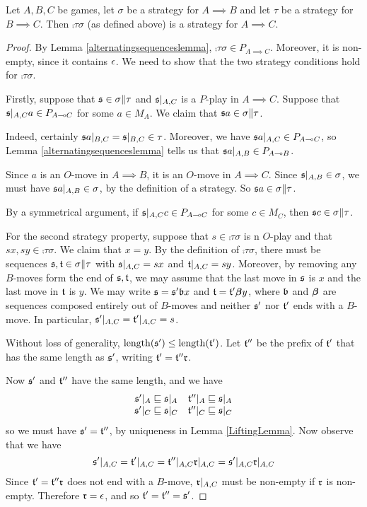 \documentclass[11pt]{article} %
\begin{document}
\begin{proposition}
  Let $A,B,C$ be games, let $\sigma$ be a strategy for $A\implies B$ and let $\tau$ be a strategy for $B\implies C$.  Then $\comp\tau\sigma$ (as defined above) is a strategy for $A\implies C$.  

  \begin{proof}
    By Lemma \ref{alternatingsequenceslemma}, $\comp\tau\sigma\in P_{A\implies C}$.  Moreover, it is non-empty, since it contains $\epsilon$.  We need to show that the two strategy conditions hold for $\comp\tau\sigma$.  

    Firstly, suppose that $\mathfrak s\in\sigma\|\tau$ and $\mathfrak s\vert_{A,C}$ is a $P$-play in $A\implies C$.  Suppose that $\mathfrak s\vert_{A,C} a\in P_{A\multimap C}$ for some $a\in M_A$.  We claim that $\mathfrak s a\in\sigma\|\tau$.  

    Indeed, certainly $\mathfrak s a\vert_{B,C}=\mathfrak s\vert_{B,C}\in\tau$.  Moreover, we have $\mathfrak s a\vert_{A,C}\in P_{A\multimap C}$, so Lemma \ref{alternatingsequenceslemma} tells us that $\mathfrak s a\vert_{A,B}\in P_{A\multimap B}$.  

    Since $a$ is an $O$-move in $A\implies B$, it is an $O$-move in $A\implies C$.  Since $\mathfrak s\vert_{A,B}\in\sigma$, we must have $\mathfrak s a\vert_{A,B}\in\sigma$, by the definition of a strategy.  So $\mathfrak s a\in\sigma\|\tau$.  

    By a symmetrical argument, if $\mathfrak s\vert_{A,C} c\in P_{A\multimap C}$ for some $c\in M_C$, then $\mathfrak s c\in\sigma\|\tau$.  

    For the second strategy property, suppose that $s\in\comp\tau\sigma$ is n $O$-play and that $sx, sy\in\comp\tau\sigma$.  We claim that $x=y$.  By the definition of $\comp\tau\sigma$, there must be sequences $\mathfrak s,\mathfrak t\in\sigma\|\tau$ with $\mathfrak s\vert_{A,C}=sx$ and $\mathfrak t\vert_{A,C}=sy$.  Moreover, by removing any $B$-moves form the end of $\mathfrak s,\mathfrak t$, we may assume that the last move in $\mathfrak s$ is $x$ and the last move in $\mathfrak t$ is $y$.  We may write $\mathfrak s=\mathfrak s'\mathfrak b x$ and $\mathfrak t=\mathfrak t'{\bm{\beta}} y$, where $\mathfrak b$ and ${\bm{\beta}}$ are sequences composed entirely out of $B$-moves and neither $\mathfrak s'$ nor $\mathfrak t'$ ends with a $B$-move.  In particular, $\mathfrak s'\vert_{A,C}=\mathfrak t'\vert_{A,C}=s$.

    Without loss of generality, $\operatorname{length}(\mathfrak s')\le\operatorname{length}(\mathfrak t')$.  Let $\mathfrak t''$ be the prefix of $\mathfrak t'$ that has the same length as $\mathfrak s'$, writing $\mathfrak t'=\mathfrak t''\mathfrak r$.

    Now $\mathfrak s'$ and $\mathfrak t''$ have the same length, and we have
    \[
      \begin{matrix}
        \mathfrak s'\vert_A\sqsubseteq\mathfrak s\vert_A & \mathfrak t''\vert_A\sqsubseteq\mathfrak s\vert_A \\
        \mathfrak s'\vert_C\sqsubseteq\mathfrak s\vert_C & \mathfrak t''\vert_C\sqsubseteq\mathfrak s\vert_C
      \end{matrix}
      \]
    so we must have $\mathfrak s'=\mathfrak t''$, by uniqueness in Lemma \ref{LiftingLemma}.  Now observe that we have
    \[
      \mathfrak s'\vert_{A,C}=\mathfrak t'\vert_{A,C}=\mathfrak t''\vert_{A,C}\mathfrak r\vert_{A,C}=\mathfrak s'\vert_{A,C}\mathfrak r\vert_{A,C}
      \]
    Since $\mathfrak t'=\mathfrak t''\mathfrak r$ does not end with a $B$-move, $\mathfrak r\vert_{A,C}$ must be non-empty if $\mathfrak r$ is non-empty.  Therefore $\mathfrak r=\epsilon$, and so $\mathfrak t'=\mathfrak t''=\mathfrak s'$.


\end{proof}
\end{proposition}
\end{document}
